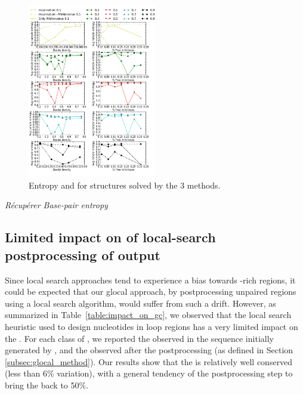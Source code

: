 \begin{figure}[ht!]
	\centering
	\includegraphics[width=0.5\textwidth]{Figures/RNAinverse_data_100.png}
	\caption{Entropy and \GCContent  for structures solved by
	the 3 methods.}
	\label{fig:rnainverse}
\end{figure}
{\em Récupérer Base-pair entropy}


%
\subsection{Limited impact on \GC of local-search postprocessing of \ourprog output}
Since local search approaches tend to experience a bias towards \GC{}-rich regions, it could be expected that our glocal approach, by postprocessing unpaired regions using a local search algorithm, would suffer from such a drift.
However, as summarized in Table~\ref{table:impact_on_gc}, we observed that the local search heuristic used to design nucleotides in loop regions has a very limited impact on the \GCContent. For each class of \GCContent, we reported the observed \GCContent in the sequence initially generated by \ourprog, and the observed \GCContent after the \RNAinverse postprocessing (as defined in Section \ref{subsec:glocal_method}). Our results show that the \GCContent is relatively well conserved (less than 6\% variation), with a general tendency of the postprocessing step to bring the \GCContent back to 50\%. 

